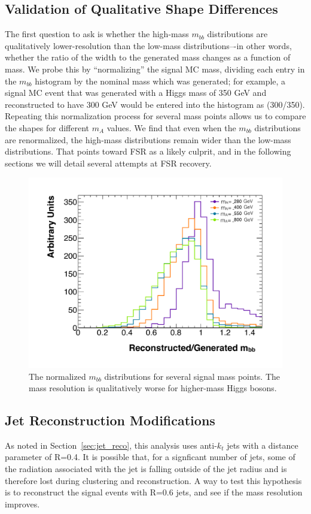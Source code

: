\subsection{Validation of Qualitative Shape Differences}
The first question to ask is whether the high-mass $m_{bb}$ distributions are qualitatively lower-resolution than
the low-mass distributions–-in other words, whether the ratio of the width to the generated mass changes
as a function of mass. We probe this by ``normalizing'' the signal MC mass, dividing each entry in the $m_{bb}$
histogram by the nominal mass which was generated; for example, a signal MC event that was generated
with a Higgs mass of 350 GeV and reconstructed to have 300 GeV would be entered into the histogram
as (300/350). Repeating this normalization process for several mass points allows us to compare the
shapes for different $m_A$ values.
We find that even when the $m_{bb}$ distributions are renormalized, the high-mass distributions remain
wider than the low-mass distributions. That points toward FSR as a likely culprit, and in the following
sections we will detail several attempts at FSR recovery.
\begin{figure}[hbt]
  \includegraphics[width=0.78\linewidth]{SignalKin/mbb_normalized_signal.pdf}
  \caption{The normalized $m_{bb}$ distributions for several signal mass points. The mass resolution
  is qualitatively worse for higher-mass Higgs bosons.\label{fig:mbb_norm}}
\end{figure}





\subsection{Jet Reconstruction Modifications}
As noted in Section~\ref{sec:jet_reco}, this analysis uses anti-$k_t$ jets with a distance parameter
of R=0.4.  It is possible that, for a signficant number of jets, some of the radiation associated
with the jet is falling outside of the jet radius and is therefore lost during clustering and
reconstruction.  A way to test this hypothesis is to reconstruct the signal events with R=0.6
jets, and see if the mass resolution improves. 

